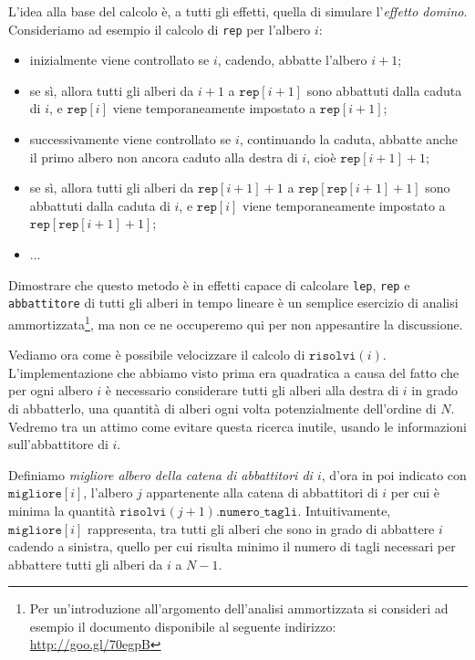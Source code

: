 L'idea alla base del calcolo è, a tutti gli effetti, quella di simulare l'\emph{effetto domino}. Consideriamo ad esempio il calcolo di \texttt{rep} per l'albero $i$:
\begin{itemize}[nolistsep, itemsep=2mm]
	\item inizialmente viene controllato se $i$, cadendo, abbatte l'albero $i+1$;
	\item se sì, allora tutti gli alberi da $i+1$ a $\texttt{rep}[i+1]$ sono abbattuti dalla caduta di $i$, e $\texttt{rep}[i]$ viene temporaneamente impostato a $\texttt{rep}[i+1]$;
	\item successivamente viene controllato se $i$, continuando la caduta, abbatte anche il primo albero non ancora caduto alla destra di $i$, cioè $\texttt{rep}[i+1] + 1$;
	\item se sì, allora tutti gli alberi da $\texttt{rep}[i+1] + 1$ a $\texttt{rep}[\texttt{rep}[i+1] + 1]$ sono abbattuti dalla caduta di $i$, e $\texttt{rep}[i]$ viene temporaneamente impostato a $\texttt{rep}[\texttt{rep}[i+1] + 1]$;
	\item ...
\end{itemize}
Dimostrare che questo metodo è in effetti capace di calcolare \texttt{lep}, \texttt{rep} e \texttt{abbattitore} di tutti gli alberi in tempo lineare è un semplice esercizio di analisi ammortizzata\footnote{Per un'introduzione all'argomento dell'analisi ammortizzata si consideri ad esempio il documento disponibile al seguente indirizzo: \url{http://goo.gl/70egpB}}, ma non ce ne occuperemo qui per non appesantire la discussione.

Vediamo ora come è possibile velocizzare il calcolo di $\texttt{risolvi}(i)$. L'implementazione che abbiamo visto prima era quadratica a causa del fatto che per ogni albero $i$ è necessario considerare tutti gli alberi alla destra di $i$ in grado di abbatterlo, una quantità di alberi ogni volta potenzialmente dell'ordine di $N$. Vedremo tra un attimo come evitare questa ricerca inutile, usando le informazioni sull'abbattitore di $i$.

Definiamo \emph{migliore albero della catena di abbattitori di $i$}, d'ora in poi indicato con $\texttt{migliore}[i]$, l'albero $j$ appartenente alla catena di abbattitori di $i$ per cui è minima la quantità $\texttt{risolvi}(j + 1).\texttt{numero\_tagli}$. Intuitivamente, $\texttt{migliore}[i]$ rappresenta, tra tutti gli alberi che sono in grado di abbattere $i$ cadendo a sinistra, quello per cui risulta minimo il numero di tagli necessari per abbattere tutti gli alberi da $i$ a $N-1$.

